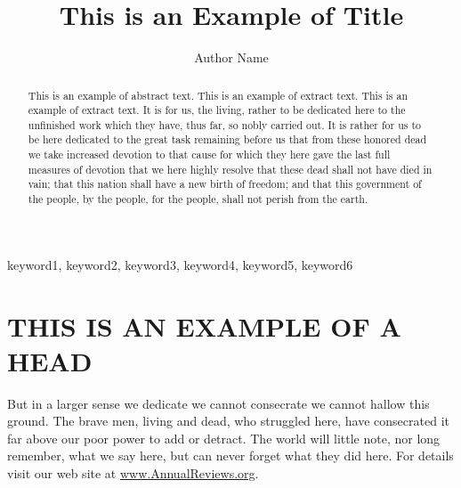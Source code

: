 \documentclass{ar2e}
\begin{document}




\title{This is an Example of  Title}


\author{Author Name
}

\begin{keywords}
keyword1, keyword2, keyword3, keyword4, keyword5, keyword6 
\end{keywords}

\begin{abstract}
This is an example of abstract text. This is an example of extract text. This is an example of extract text. It is for us, the living, rather to be
dedicated here to the unfinished work which they have, thus far, so nobly
carried out. It is rather for us to be here dedicated to the great task
remaining before us that from these honored dead we take increased
devotion to that cause for which they here gave the last full measures of
devotion that we here highly resolve that these dead shall not have
died in vain; that this nation shall have a new birth of freedom; and that
this government of the people, by the people, for the people, shall not
perish from the earth.
\end{abstract}

\maketitle

\section{THIS IS AN EXAMPLE OF A HEAD}

But in a larger sense we  dedicate  we cannot consecrate  we
cannot hallow this ground. The brave men, living and dead, who struggled
here, have consecrated it far above our poor power to add or detract. The
world will little note, nor long remember, what we say here, but can never
forget what they did here. For details visit our 
web site at \url{www.AnnualReviews.org}.
\end{document}
